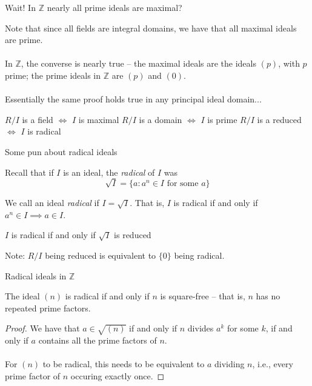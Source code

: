\documentclass{beamer}
\begin{document}
\begin{frame}{Wait!  In $\mathbb{Z}$ nearly all prime ideals are maximal?}

Note that since all fields are integral domains, we have that all maximal ideals are prime. \\~\\

In $\mathbb{Z}$, the converse is nearly true -- the maximal ideals are the ideals $(p)$, with $p$ prime; the prime ideals in $\mathbb{Z}$ are $(p)$ and $(0)$. \\~\\

Essentially the same proof holds true in any principal ideal domain...

\end{frame}


\begin{frame}[plain, c]


\huge
\begin{center}

$R/I$ is a field $\iff$ $I$ is maximal
$R/I$ is a domain $\iff$ $I$ is prime
{ $R/I$ is a reduced $\iff$ $I$ is radical}

\end{center}
\end{frame}

\begin{frame}{Some pun about radical ideals}

Recall that if $I$ is an ideal, the \emph{radical} of $I$ was
$$\sqrt{I}=\{a : a^n\in I\text{ for some } a\}$$

\begin{definition}
We call an ideal \emph{radical} if $I=\sqrt{I}$.  That is, $I$ is radical if and only if $a^n\in I\implies a\in I$.
\end{definition}

\begin{lemma}
$I$ is radical if and only if $\sqrt{I}$ is reduced
\end{lemma}

Note: $R/I$ being reduced is equivalent to $\{0\}$ being radical.

\end{frame}


\begin{frame}{Radical ideals in $\mathbb{Z}$}

\begin{lemma} The ideal $(n)$ is radical if and only if $n$ is square-free -- that is, $n$ has no repeated prime factors.
\end{lemma}

\begin{proof}
We have that $a\in \sqrt{(n)}$ if and only if $n$ divides $a^k$ for some $k$, if and only if $a$ contains all the prime factors of $n$.  \\~\\

For $(n)$ to be radical, this needs to be equivalent to $a$ dividing $n$, i.e., every prime factor of $n$ occuring exactly once.

\end{proof}

\end{frame}
\end{document}
